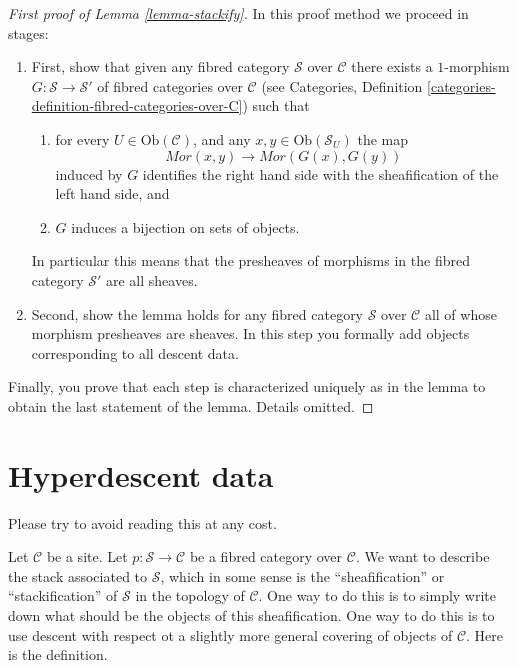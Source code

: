 \begin{proof}[First proof of Lemma \ref{lemma-stackify}]
In this proof method we proceed in stages:
\begin{enumerate}
\item First, show that given any fibred category $\mathcal{S}$
over $\mathcal{C}$ there exists a 
$1$-morphism $G : \mathcal{S} \to \mathcal{S}'$
of fibred categories over $\mathcal{C}$ (see
Categories, Definition \ref{categories-definition-fibred-categories-over-C})
such that
\begin{enumerate}
\item for every $U \in \text{Ob}(\mathcal{C})$, and any
$x, y \in \text{Ob}(\mathcal{S}_U)$ the map
$$
\mathit{Mor}(x, y) \longrightarrow \mathit{Mor}(G(x), G(y))
$$
induced by $G$ identifies the right hand side with the sheafification
of the left hand side, and
\item $G$ induces a bijection on sets of objects.
\end{enumerate}
In particular this means that the presheaves of morphisms
in the fibred category $\mathcal{S}'$ are all sheaves.
\item Second, show the lemma holds for any fibred category $\mathcal{S}$
over $\mathcal{C}$ all of whose morphism presheaves are sheaves.
In this step you formally add objects corresponding to all descent data.
\end{enumerate}
Finally, you prove that each step is characterized uniquely as in the lemma
to obtain the last statement of the lemma.
Details omitted.
\end{proof}














\section{Hyperdescent data}
\label{section-hyperdescent}

\noindent
Please try to avoid reading this at any cost.

\medskip\noindent
Let $\mathcal{C}$ be a site.
Let $p : \mathcal{S} \to \mathcal{C}$ be a fibred category over $\mathcal{C}$.
We want to describe the stack associated to $\mathcal{S}$, which in some
sense is the ``sheafification'' or ``stackification''
of $\mathcal{S}$ in the topology of $\mathcal{C}$.
One way to do this is to simply write down what should be the
objects of this sheafification. One way to do this is to use descent
with respect ot a slightly more general covering of objects of
$\mathcal{C}$. Here is the definition.

